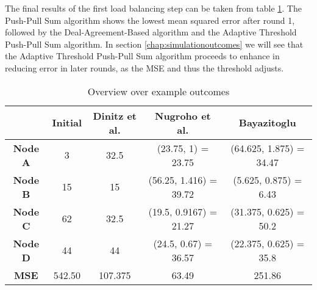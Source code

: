The final results of the first load balancing step can be taken from table \ref{tab:overviewExamples}. The Push-Pull Sum algorithm shows the lowest mean squared error after round 1, followed by the Deal-Agreement-Based algorithm and the Adaptive Threshold Push-Pull Sum algorithm. In section \ref{chap:simulationoutcomes} we will see that the Adaptive Threshold Push-Pull Sum algorithm proceeds to enhance in reducing error in later rounds, as the MSE and thus the threshold adjusts.
\begin{table}[]
\begin{tabular}{|c|c|c|c|c|}
\hline
 & \textbf{Initial} & \textbf{Dinitz et al.} & \textbf{Nugroho et al.} & \textbf{Bayazitoglu} \\ \hline
\textbf{Node A}  & 3      & 32.5    & (23.75, 1) = 23.75     & (64.625, 1.875) = 34.47 \\ \hline
\textbf{Node B}  & 15     & 15      & (56.25, 1.416) = 39.72 & (5.625, 0.875) = 6.43   \\ \hline
\textbf{Node C}  & 62     & 32.5    & (19.5, 0.9167) = 21.27 & (31.375, 0.625) = 50.2  \\ \hline
\textbf{Node D}  & 44     & 44      & (24.5, 0.67) = 36.57   & (22.375, 0.625) = 35.8  \\ \hline
\textbf{MSE} & 542.50 & 107.375 & 63.49                  & 251.86                  \\ \hline
\end{tabular}
\caption{Overview over example outcomes}
\label{tab:overviewExamples}
\end{table}